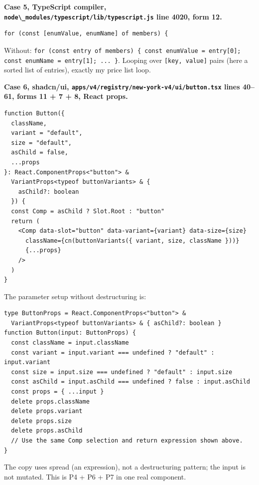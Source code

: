 \textbf{Case 5, TypeScript compiler, \passthrough{\lstinline!node\_modules/typescript/lib/typescript.js!} line 4020, form 12.}

\begin{lstlisting}
for (const [enumValue, enumName] of members) {
\end{lstlisting}

Without: \passthrough{\lstinline!for (const entry of members) \{ const enumValue = entry[0]; const enumName = entry[1]; ... \}!}. Looping over \passthrough{\lstinline![key, value]!}
pairs (here a sorted list of entries), exactly my price list loop.

\textbf{Case 6, shadcn/ui, \passthrough{\lstinline!apps/v4/registry/new-york-v4/ui/button.tsx!} lines 40--61, forms 11 + 7 + 8, React props.}

\begin{lstlisting}
function Button({
  className,
  variant = "default",
  size = "default",
  asChild = false,
  ...props
}: React.ComponentProps<"button"> &
  VariantProps<typeof buttonVariants> & {
    asChild?: boolean
  }) {
  const Comp = asChild ? Slot.Root : "button"
  return (
    <Comp data-slot="button" data-variant={variant} data-size={size}
      className={cn(buttonVariants({ variant, size, className }))}
      {...props}
    />
  )
}
\end{lstlisting}

The parameter setup without destructuring is:

\begin{lstlisting}
type ButtonProps = React.ComponentProps<"button"> &
  VariantProps<typeof buttonVariants> & { asChild?: boolean }
function Button(input: ButtonProps) {
  const className = input.className
  const variant = input.variant === undefined ? "default" : input.variant
  const size = input.size === undefined ? "default" : input.size
  const asChild = input.asChild === undefined ? false : input.asChild
  const props = { ...input }
  delete props.className
  delete props.variant
  delete props.size
  delete props.asChild
  // Use the same Comp selection and return expression shown above.
}
\end{lstlisting}

The copy uses spread (an expression), not a destructuring pattern; the input is not mutated.
This is P4 + P6 + P7 in one real component.

